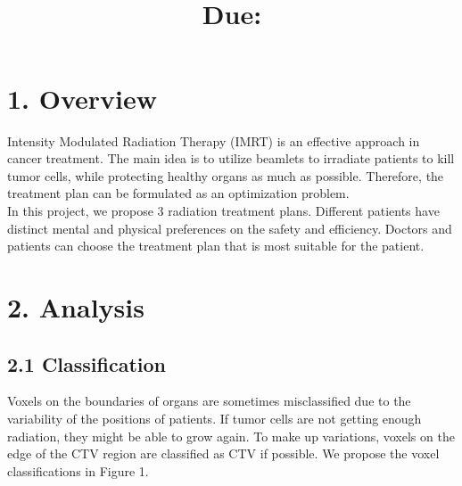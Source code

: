 \documentclass{report}
\title{
    \vspace{2in}
    \textmd{\textbf{\hmwkClass}}\\
    \textmd{\textbf{\hmwkTitle}}\\
    \normalsize\vspace{0.1in}\small{Due: \hmwkDueDate}\\
    \vspace{3in}
}
\author{\hmwkAuthorName}
\date{}
\begin{document}
\maketitle

\pagebreak
\tableofcontents

\newpage


\section{1. Overview}
Intensity Modulated Radiation Therapy (IMRT) is an effective approach in cancer treatment. The main idea is to utilize beamlets to irradiate patients to kill tumor cells, while protecting healthy organs as much as possible. Therefore, the treatment plan can be formulated as an optimization problem. \\

In this project, we propose 3 radiation treatment plans. Different patients have distinct mental and physical preferences on the safety and efficiency. Doctors and patients can choose the treatment plan that is most suitable for the patient.

\section{2. Analysis}

\subsection{2.1 Classification}

Voxels on the boundaries of organs are sometimes misclassified due to the variability of the positions of patients. If tumor cells are not getting enough radiation, they might be able to grow again. To make up variations, voxels on the edge of the CTV region are classified as CTV if possible. We propose the voxel classifications in Figure 1.\\
\end{document}

